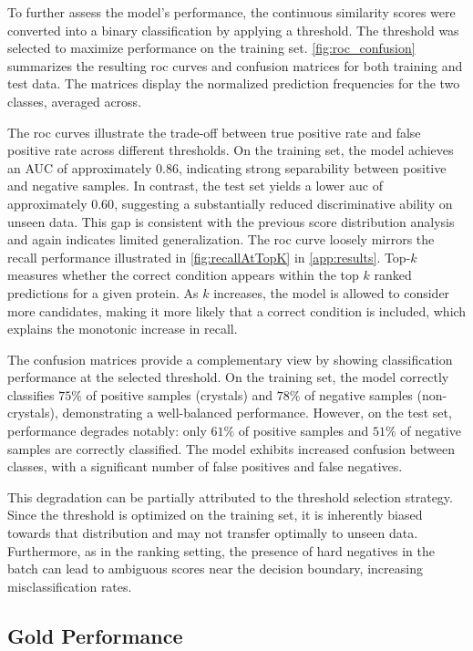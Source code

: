 To further assess the model's performance, the continuous similarity scores were converted into a binary classification by applying a threshold. The threshold was selected to maximize performance on the training set. \autoref{fig:roc_confusion} summarizes the resulting \gls{roc} curves and confusion matrices for both training and test data. The matrices display the normalized prediction frequencies for the two classes, averaged across.

The \gls{roc} curves illustrate the trade-off between true positive rate and false positive rate across different thresholds. On the training set, the model achieves an AUC of approximately $0.86$, indicating strong separability between positive and negative samples. In contrast, the test set yields a lower \gls{auc} of approximately $0.60$, suggesting a substantially reduced discriminative ability on unseen data. This gap is consistent with the previous score distribution analysis and again indicates limited generalization. The \gls{roc} curve loosely mirrors the recall performance illustrated in \autoref{fig:recallAtTopK} in \autoref{app:results}. Top-$k$ measures whether the correct condition appears within the top $k$ ranked predictions for a given protein. As $k$ increases, the model is allowed to consider more candidates, making it more likely that a correct condition is included, which explains the monotonic increase in recall. 

The confusion matrices provide a complementary view by showing classification performance at the selected threshold. On the training set, the model correctly classifies $75\%$ of positive samples (crystals) and $78\%$ of negative samples (non-crystals), demonstrating a well-balanced performance. However, on the test set, performance degrades notably: only $61\%$ of positive samples and $51\%$ of negative samples are correctly classified. The model exhibits increased confusion between classes, with a significant number of false positives and false negatives.

This degradation can be partially attributed to the threshold selection strategy. Since the threshold is optimized on the training set, it is inherently biased towards that distribution and may not transfer optimally to unseen data. Furthermore, as in the ranking setting, the presence of hard negatives in the batch can lead to ambiguous scores near the decision boundary, increasing misclassification rates.

\subsection{Gold Performance}\label{sec:results/evaluation/gold_performance}

